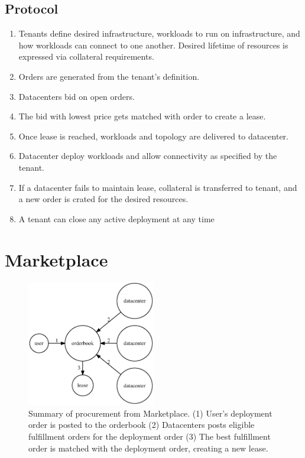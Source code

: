 \documentclass[11pt,english]{article}
\theoremstyle{definition}
\begin{document}
\subsection{Protocol}
\begin{enumerate}
  \item Tenants define desired infrastructure, workloads to run on infrastructure, and how workloads can connect to one another. Desired lifetime of resources is expressed via collateral requirements.
  \item Orders are generated from the tenant's definition.
  \item Datacenters bid on open orders.
  \item The bid with lowest price gets matched with order to create a lease.
  \item Once lease is reached, workloads and topology are delivered to datacenter.
  \item Datacenter deploy workloads and allow connectivity as specified by the tenant.
  \item If a datacenter fails to maintain lease, collateral is transferred to tenant, and a new order is crated for the desired resources.
  \item A tenant can close any active deployment at any time
\end{enumerate}

\section{Marketplace}

\begin{figure}[hbt]
  \centering
  \includegraphics[width=0.5\textwidth]{marketplace}
  \caption{Summary of procurement from Marketplace. (1) User's deployment order is posted to the orderbook (2)
Datacenters posts eligible fulfillment orders for the deployment order (3) The best fulfillment order is matched with the deployment order, creating a new lease.
}
\end{figure}
\end{document}

